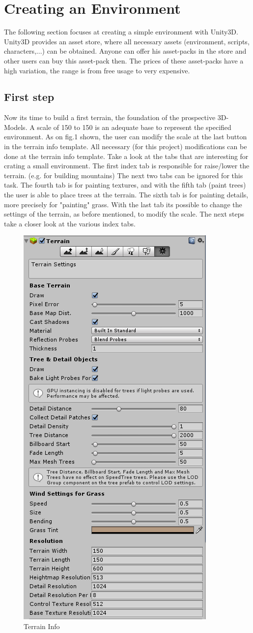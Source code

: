 \documentclass[12pt, a4paper, titlepage]{article}
\begin{document}
\section{Creating an Environment}

The following section focuses at creating a simple environment with Unity3D. 
Unity3D provides an asset store, where all necessary assets (environment, scripts, characters,...) can be obtained. Anyone can offer his asset-packs in the store and other users can buy this asset-pack then. The prices of these asset-packs have a high variation, the range is from free usage to very expensive. 
 
\subsection{First step}

Now its time to build a first terrain, the foundation of the prospective 3D-Models. A scale of 150 to 150 is an adequate base to represent the specified environment. As on fig.1 shown, the user can modify the scale at the last button in the terrain info template. All necessary (for this project) modifications can be done at the terrain info template. Take a look at the tabs that are interesting for crating a small environment. The first index tab is responsible for raise/lower the terrain. (e.g. for building mountains) The next two tabs can be ignored for this task. The fourth tab is for painting textures, and with the fifth tab (paint trees) the user is able to place trees at the terrain. The sixth tab is for painting details, more precisely for "painting" grass. With the last tab its possible to change the settings of the terrain, as before mentioned, to modify the scale. The next steps take a closer look at the various index tabs.
\begin{figure}[htbp]
  \centering
  \includegraphics[width=.4\textwidth]{pictures/terrain_info}
  \caption{Terrain Info}
  \label{fig:terrain_info}
\end{figure}
\end{document}
